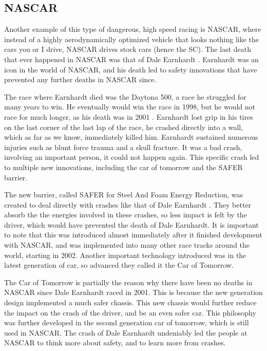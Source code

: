 \documentclass[letterpaper, 12pt]{article}
\numberwithin{figure}{section}
\begin{document}
\subsection{NASCAR}
Another example of this type of dangerous, high speed racing is NASCAR, where instead of a highly aerodynamically optimized vehicle that looks nothing like the cars you or I drive, NASCAR drives stock cars (hence the SC). The last death that ever happened in NASCAR was that of Dale Earnhardt \cite{earnhardt}. Earnhardt was an icon in the world of NASCAR, and his death led to safety innovations that have prevented any further deaths in NASCAR since.

The race where Earnhardt died was the Daytona 500, a race he struggled for many years to win. He eventually would win the race in 1998, but he would not race for much longer, as his death was in 2001 \cite{earnhardt}. Earnhardt lost grip in his tires on the last corner of the last lap of the race, he crashed directly into a wall, which as far as we know, immediately killed him. Earnhardt sustained numerous injuries such as blunt force trauma and a skull fracture. It was a bad crash, involving an important person, it could not happen again. This specific crash led to multiple new innovations, including the car of tomorrow and the SAFER barrier.

The new barrier, called SAFER for Steel And Foam Energy Reduction, was created to deal directly with crashes like that of Dale Earnhardt \cite{smith_2016}. They better absorb the the energies involved in these crashes, so less impact is felt by the driver, which would have prevented the death of Dale Earnhardt. It is important to note that this was introduced almost immediately after it finished development with NASCAR, and was implemented into many other race tracks around the world, starting in 2002. Another important technology introduced was in the latest generation of car, so advanced they called it the Car of Tomorrow.

The Car of Tomorrow is partially the reason why there have been no deaths in NASCAR since Dale Earnhardt raced in 2001. This is because the new generation design implemented a much safer chassis. This new chassis would further reduce the impact on the crash of the driver, and be an even safer car. This philosophy was further developed in the second generation car of tomorrow, which is still used in NASCAR. The crash of Dale Earnhardt undeniably led the people at NASCAR to think more about safety, and to learn more from crashes. 
\end{document}

